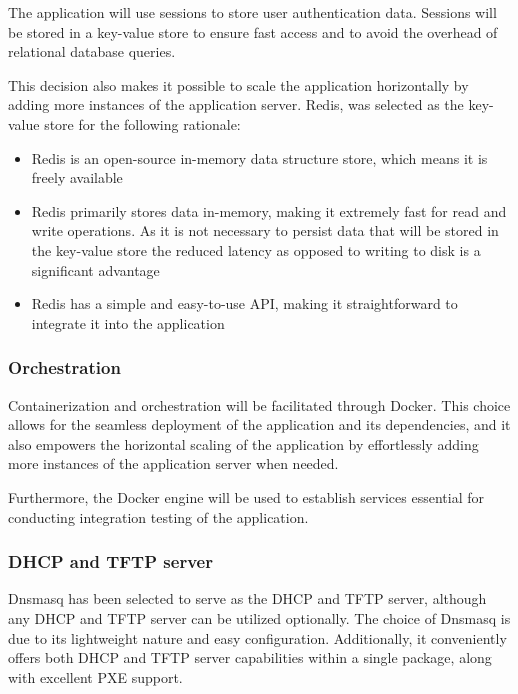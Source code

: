 \documentclass[../main.tex]{subfiles}
\begin{document}
The application will use sessions to store user authentication data. Sessions will be stored in a key-value store to ensure fast access and to avoid the overhead of relational database queries.

This decision also makes it possible to scale the application horizontally by adding more instances of the application server.
Redis\cite{redis}, was selected as the key-value store for the following rationale:

\begin{itemize}
  \item Redis is an open-source in-memory data structure store, which means it is freely available
  \item Redis primarily stores data in-memory, making it extremely fast for read and write operations. As it is not necessary to persist data that will be stored in the key-value store the reduced latency as opposed to writing to disk is a significant advantage
  \item Redis has a simple and easy-to-use API, making it straightforward to integrate it into the application
\end{itemize}

\subsubsection{Orchestration}

Containerization and orchestration will be facilitated through Docker\cite{docker}.
This choice allows for the seamless deployment of the application and its dependencies, and it also empowers the horizontal scaling of the application by effortlessly adding more instances of the application server when needed.

Furthermore, the Docker engine will be used to establish services essential for conducting integration testing of the application.

\subsubsection{DHCP and TFTP server}

Dnsmasq\cite{dnsmasq} has been selected to serve as the DHCP and TFTP server, although any DHCP and TFTP server can be utilized optionally. The choice of Dnsmasq is due to its lightweight nature and easy configuration.
Additionally, it conveniently offers both DHCP and TFTP server capabilities within a single package, along with excellent PXE support.
\end{document}
